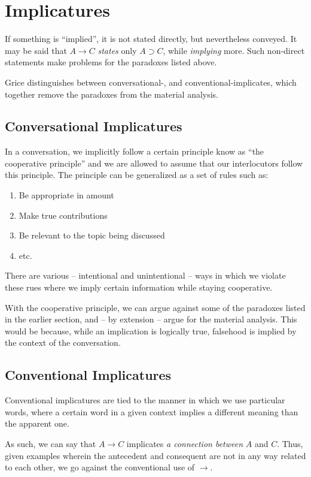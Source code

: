 \documentclass[12pt]{report}
\begin{document}
\section{Implicatures}

If something is ``implied'', it is not stated directly, but nevertheless
conveyed. It may be said that $A \rightarrow C$ \emph{states} only $A \supset
C$, while \emph{implying} more. Such non-direct statements make problems for the
paradoxes listed above.

Grice distinguishes between conversational-, and conventional-implicates, which
together remove the paradoxes from the material analysis.

\subsection{Conversational Implicatures}

In a conversation, we implicitly follow a certain principle know as ``the
cooperative principle'' and we are allowed to assume that our interlocutors
follow this principle. The principle can be generalized as a set of rules such
as:
\begin{enumerate}
	\item
		Be appropriate in amount
	\item
		Make true contributions
	\item
		Be relevant to the topic being discussed
	\item
		etc.
\end{enumerate}
There are various -- intentional and unintentional -- ways in which we violate
these rues where we imply certain information while staying cooperative.

With the cooperative principle, we can argue against some of the paradoxes
listed in the earlier section, and -- by extension -- argue for the material
analysis. This would be because, while an implication is logically true,
falsehood is implied by the context of the conversation.

\subsection{Conventional Implicatures}

Conventional implicatures are tied to the manner in which we use particular
words, where a certain word in a given context implies a different meaning than
the apparent one.

As such, we can say that $A \rightarrow C$ implicates \emph{a connection
between} $A$ and $C$. Thus, given examples wherein the antecedent and consequent
are not in any way related to each other, we go against the conventional use of
$\rightarrow$.
\end{document}
